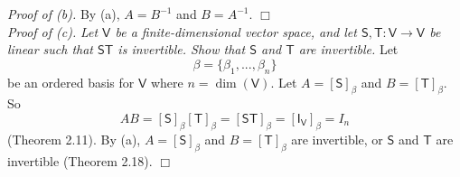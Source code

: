 \documentclass{article}
\begin{document}
\emph{Proof of (b).}
By (a), $A = B^{-1}$ and $B = A^{-1}$.
$\Box$ \\

\emph{Proof of (c).}
\emph{Let $\mathsf{V}$ be a finite-dimensional vector space,
and let $\mathsf{S}, \mathsf{T}: \mathsf{V} \to \mathsf{V}$ be linear
such that $\mathsf{S}\mathsf{T}$ is invertible.
Show that $\mathsf{S}$ and $\mathsf{T}$ are invertible.}
Let
$$\beta = \{ \beta_1, ..., \beta_n \}$$
be an ordered basis for $\mathsf{V}$ where $n = \dim(\mathsf{V})$.
Let $A = [\mathsf{S}]_\beta$ and $B = [\mathsf{T}]_\beta$.
So
$$AB
= [\mathsf{S}]_\beta [\mathsf{T}]_\beta
= [\mathsf{S} \mathsf{T}]_\beta
= [\mathsf{I}_{\mathsf{V}} ]_\beta = I_n$$ (Theorem 2.11).
By (a), $A = [\mathsf{S}]_\beta$ and $B = [\mathsf{T}]_\beta$ are invertible,
or $\mathsf{S}$ and $\mathsf{T}$ are invertible (Theorem 2.18).
$\Box$ \\\\
\end{document}
